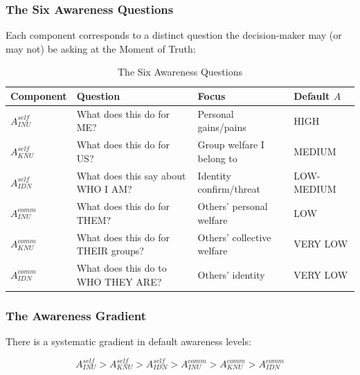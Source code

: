 \subsubsection{The Six Awareness Questions}

Each component corresponds to a distinct question the decision-maker may
(or may not) be asking at the Moment of Truth:

\begin{table}[htbp]
\centering
\caption{The Six Awareness Questions}
\label{tab:six-questions}
\renewcommand{\arraystretch}{1.4}
\begin{tabular}{@{}llll@{}}
\toprule
\textbf{Component} & \textbf{Question} & \textbf{Focus} & \textbf{Default $A$} \\
\midrule
$A^{self}_{INU}$ & What does this do for ME? & Personal gains/pains & HIGH \\
$A^{self}_{KNU}$ & What does this do for US? & Group welfare I belong to & MEDIUM \\
$A^{self}_{IDN}$ & What does this say about WHO I AM? & Identity confirm/threat & LOW-MEDIUM \\
$A^{comm}_{INU}$ & What does this do for THEM? & Others' personal welfare & LOW \\
$A^{comm}_{KNU}$ & What does this do for THEIR groups? & Others' collective welfare & VERY LOW \\
$A^{comm}_{IDN}$ & What does this do to WHO THEY ARE? & Others' identity & VERY LOW \\
\bottomrule
\end{tabular}
\end{table}

\subsubsection{The Awareness Gradient}

There is a systematic gradient in default awareness levels:

\begin{equation}
\boxed{A^{self}_{INU} > A^{self}_{KNU} > A^{self}_{IDN} > A^{comm}_{INU} > A^{comm}_{KNU} > A^{comm}_{IDN}}
\label{eq:awareness-gradient}
\end{equation}

